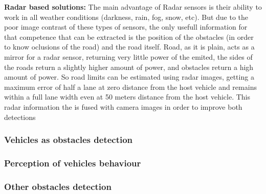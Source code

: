\textbf{Radar based solutions:}
The main advantage of Radar sensors is their ability to work in all weather conditions (darkness, rain, fog, snow, etc). But due to the poor image contrast of these types of sensors, the only usefull information for that competence that can be extracted is the position of the obstacles (in order to know oclusions of the road) and the road itself. Road, as it is plain, acts as a mirror for a radar sensor, returning very little power of the emited, the sides of the roads return a slightly higher amount of power, and obstacles return a high amount of power. So road limits can be estimated using radar images, getting a maximum error of half a lane at zero distance from the host vehicle and remains within a full lane width even at 50 meters distance from the host vehicle. This radar information the is fused with camera images in order to improve both detections \cite{kaliyaperumal2001algorithm, ma2000simultaneous, Janda2013}

\subsubsection{Vehicles as obstacles detection}



\subsubsection{Perception of vehicles behaviour}



\subsubsection{Other obstacles detection}

